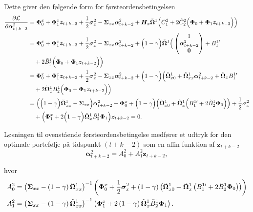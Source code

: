 \documentclass[
  a4paper,
  oneside]{memoir}
\begin{document}
Dette giver den følgende form for førsteordensbetingelsen
\begin{align*}
\frac{\partial \mathcal{L}}{\partial\bm{\alpha}_{t+k-2}^2 }&= \bm{\Phi}_0^x+\bm{\Phi}_1^x\bm{z}_{t+k-2}+\frac{1}{2} \bm{\sigma}_x^2 -\bm{\Sigma}_{xx}\bm{\alpha}_{t+k-2}^2 +\bm{H}_x\Tilde{\bm{\Omega}}^{1}\Big(C_1^2+ 2\Tilde{C}_2^2 \Big(\bm{\Phi}_0+\bm{\Phi}_1\bm{z}_{t+k-2}\Big)\Big)\\
&=\bm{\Phi}_0^x+\bm{\Phi}_1^x\bm{z}_{t+k-2}+\frac{1}{2} \bm{\sigma}_x^2 -\bm{\Sigma}_{xx}\bm{\alpha}_{t+k-2}^2 + \Big(1-\gamma\Big)\Tilde{\bm{\Omega}}^{1} \Big(\begin{pmatrix} 1\\ \bm{\alpha}_{t+k-2}^2 \\ \bm{0} \end{pmatrix} + B_1^{1\prime}\\
&\quad + 2\Tilde{B}_2^1 \Big(\bm{\Phi}_0+\bm{\Phi}_1\bm{z}_{t+k-2}\Big)\Big)\\
&=\bm{\Phi}_0^x+\bm{\Phi}_1^x\bm{z}_{t+k-2}+\frac{1}{2} \bm{\sigma}_x^2 -\bm{\Sigma}_{xx}\bm{\alpha}_{t+k-2}^2 + \Big(1-\gamma\Big)\Big(\Tilde{\bm{\Omega}}_{x0}^{1} + \Tilde{\bm{\Omega}}_{xx}^{1} \bm{\alpha}_{t+k-2}^2 + \Tilde{\bm{\Omega}}_{x} B_1^{1\prime}\\
&\quad + 2\Tilde{\bm{\Omega}}_{x}^1 \Tilde{B}_2^1 \Big(\bm{\Phi}_0+\bm{\Phi}_1\bm{z}_{t+k-2}\Big)\Big)\\
&=\Big(\Big(1-\gamma\Big)\Tilde{\bm{\Omega}}_{xx}^{1} - \bm{\Sigma}_{xx} \Big)  \bm{\alpha}_{t+k-2}^2 + \bm{\Phi}_0^x + \Big(1-\gamma\Big)\Big(\Tilde{\bm{\Omega}}_{x0}^{1} + \Tilde{\bm{\Omega}}_{x}^{1}\Big(B_1^{1\prime} + 2\Tilde{B}_2^{1}\bm{\Phi}_0\Big)\Big)+ \frac{1}{2} \bm{\sigma}_x^2\\
&\quad + \Big(\bm{\Phi}_1^x + 2\Big(1-\gamma\Big)\Tilde{\bm{\Omega}}_{x}^{1} \Tilde{B}_2^1\bm{\Phi}_1 \Big)\bm{z}_{t+k-2}=0.
\end{align*}

Løsningen til ovenstående førsteordensbetingelse medfører et udtryk for den optimale portefølje på tidspunkt \((t+k-2)\) som en affin funktion af \(\bm{z}_{t+k-2}\)
\[\bm{\alpha}_{t+k-2}^2 = A_0^2 + A_1^2 \bm{z}_{t+k-2},\]

hvor
\begin{align}
A_0^2&=\left(\bm{\Sigma}_{xx} - \left(1-\gamma\right)\Tilde{\bm{\Omega}}_{xx}^1\right)^{-1} \left(\bm{\Phi}_0^x + \frac{1}{2} \bm{\sigma}_x^2 + \left(1-\gamma\right) \left(\Tilde{\bm{\Omega}}_{x0}^1 + \Tilde{\bm{\Omega}}_{x}^1 \left(B_1^{1\prime} + 2\Tilde{B}_2^{1}\bm{\Phi}_0\right)\right)\right) \label{eq:a0fra1}\\
A_1^2&=\left(\bm{\Sigma}_{xx} - \left(1-\gamma\right)\Tilde{\bm{\Omega}}_{xx}^1\right)^{-1}\left(\bm{\Phi}_1^x+2\left(1-\gamma\right) \Tilde{\bm{\Omega}}_{x}^1 \Tilde{B} _2^{1}\bm{\Phi}_1\right). \label{eq:a1fra1}
\end{align}
\end{document}
